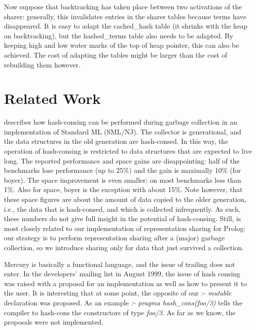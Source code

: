 \documentclass{tlp}
\begin{document}
Now suppose that backtracking has taken place between two activations
of the sharer: generally, this invalidates entries in the sharer
tables because terms have disappeared. It is easy to adapt the
cached\_hash table (it shrinks with the heap on backtracking), but the
hashed\_terms table also needs to be adapted. By keeping high and low
water marks of the top of heap pointer, this can also be achieved.
The cost of adapting the tables might be larger than the cost of
rebuilding them however.



\section{Related Work}\label{related}

\cite{appelhashconsinggc} describes how hash-consing can be performed
during garbage collection in an implementation of Standard ML
(SML/NJ). The collector is generational, and the data structures in
the old generation are hash-consed. In this way, the operation of
hash-consing is restricted to data structures that are expected to
live long. The reported performance and space gains are disappointing:
half of the benchmarks lose performance (up to 25\%) and the gain is
maximally 10\% (for boyer). The space improvement is even smaller: on
most benchmarks less than 1\%. Also for space, boyer is the exception
with about 15\%. Note however, that these space figures are about the
amount of data copied to the older generation, i.e., the data that is
hash-consed, and which is collected infrequently. As such, these
numbers do not give full insight in the potential of hash-consing. Still,
\cite{appelhashconsinggc} is most closely related to our
implementation of representation sharing for Prolog: our strategy is
to perform representation sharing after a (major) garbage collection,
so we introduce sharing only for data that just survived a collection.

Mercury \cite{zoltan:mercury} is basically a functional language, and the
issue of trailing does not enter. In the developers' mailing list in
August 1999, the issue of hash consing was raised with a proposal for an
implementation as well as how to present it to the user. It is
interesting that at some point, the opposite of our {\em :- mutable}
declaration was proposed. As an example {\em :- pragma
hash\_cons(foo/3)} tells the compiler to hash-cons the constructors of
type {\em foo/3}.  As far as we know, the proposals were not implemented.
\end{document}
